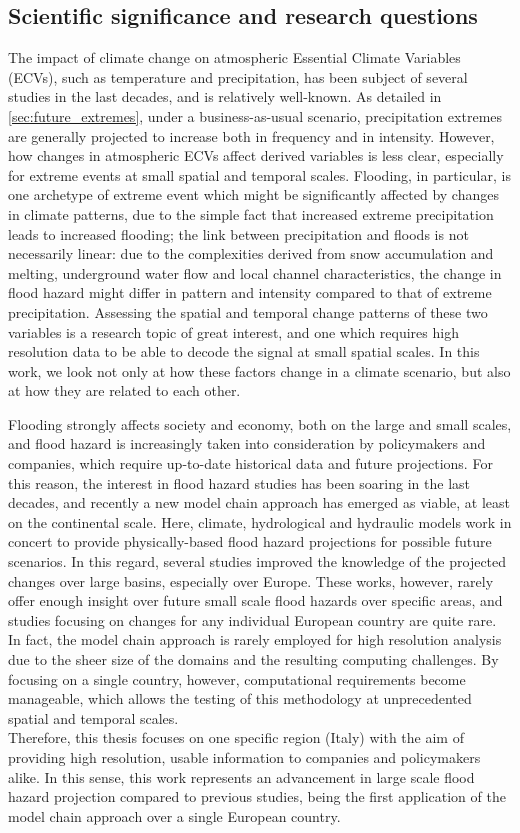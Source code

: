 \subsection{Scientific significance and research questions}\label{sec:research_questions}
The impact of climate change on atmospheric Essential Climate Variables (ECVs), such as temperature and precipitation, has been subject of several studies in the last decades, and is relatively well-known.
As detailed in \cref{sec:future_extremes}, under a business-as-usual scenario, precipitation extremes are generally projected to increase both in frequency and in intensity.
However, how changes in atmospheric ECVs affect derived variables is less clear, especially for extreme events at small spatial and temporal scales.
Flooding, in particular, is one archetype of extreme event which might be significantly affected by changes in climate patterns, due to the simple fact that increased extreme precipitation leads to increased flooding; the link between precipitation and floods is not necessarily linear: due to the complexities derived from snow accumulation and melting, underground water flow and local channel characteristics, the change in flood hazard might differ in pattern and intensity compared to that of extreme precipitation.
Assessing the spatial and temporal change patterns of these two variables is a research topic of great interest, and one which requires high resolution data to be able to decode the signal at small spatial scales.
In this work, we look not only at how these factors change in a climate scenario, but also at how they are related to each other.

Flooding strongly affects society and economy, both on the large and small scales, and flood hazard is increasingly taken into consideration by policymakers  and companies, which require up-to-date historical data and future projections.
For this reason, the interest in flood hazard studies has been soaring in the last decades, and recently a new model chain approach has emerged as viable, at least on the continental scale.
Here, climate, hydrological and hydraulic models work in concert to provide physically-based flood hazard projections for possible future scenarios.
In this regard, several studies improved the knowledge of the projected changes over large basins, especially over Europe.
These works, however, rarely offer enough insight over future small scale flood hazards over specific areas, and studies focusing on changes for any individual European country are quite rare.
In fact, the model chain approach is rarely employed for high resolution analysis due to the sheer size of the domains and the resulting computing challenges.
By focusing on a single country, however, computational requirements become manageable, which allows the testing of this methodology at unprecedented spatial and temporal scales.\\
Therefore, this thesis focuses on one specific region (Italy) with the aim of providing high resolution, usable information to companies and policymakers alike.
In this sense, this work represents an advancement in large scale flood hazard projection compared to previous studies, being the first application of the model chain approach over a single European country.

